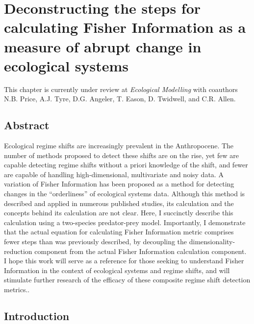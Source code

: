 \documentclass[print]{nuthesis}
\begin{document}
\hypertarget{fiGuide}{%
\chapter{Deconstructing the steps for calculating Fisher Information as a measure of abrupt change in ecological systems}\label{fiGuide}}

This chapter is currently under review at \emph{Ecological Modelling} with coauthors N.B. Price, A.J. Tyre, D.G. Angeler, T. Eason, D. Twidwell, and C.R. Allen.

\hypertarget{abstract}{%
\section{Abstract}\label{abstract}}

Ecological regime shifts are increasingly prevalent in the Anthropocene. The number of methods proposed to detect these shifts are on the rise, yet few are capable detecting regime shifts without a priori knowledge of the shift, and fewer are capable of handling high-dimensional, multivariate and noisy data. A variation of Fisher Information has been proposed as a method for detecting changes in the ``orderliness'' of ecological systems data. Although this method is described and applied in numerous published studies, its calculation and the concepts behind its calculation are not clear. Here, I succinctly describe this calculation using a two-species predator-prey model. Importantly, I demonstrate that the actual equation for calculating Fisher Information metric comprises fewer steps than was previously described, by decoupling the dimensionality-reduction component from the actual Fisher Information calculation component. I hope this work will serve as a reference for those seeking to understand Fisher Information in the context of ecological systems and regime shifts, and will stimulate further research of the efficacy of these composite regime shift detection metrics..

\hypertarget{introduction-1}{%
\section{Introduction}\label{introduction-1}}
\end{document}
